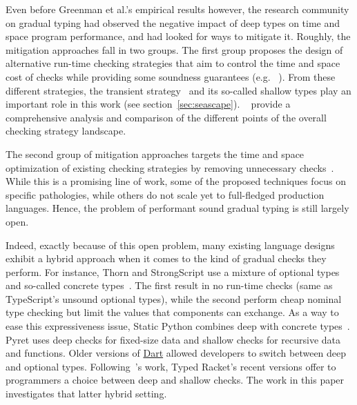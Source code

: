 Even before Greenman et al.'s empirical results however, the research
community on gradual typing had observed the negative impact of deep types
on time and space program performance, and had looked for ways to mitigate
it.  Roughly, the mitigation approaches fall in two groups. The first
group proposes the design of alternative run-time checking strategies that
aim to control the time and space cost of checks while providing
some soundness guarantees (e.g.
~\citep{sgt-esop-2009,rmhn-ecoop-2019,glfd-pj-2022,lgmvpk-pj-2023,svctg-esop-2015,rat-oopsla-2017,sfrbcsb-popl-2014,rsfbv-popl-2015,coersion-passing-style}).
From these different strategies, the transient
strategy~\cite{vksb-dls-2014,vss-popl-2017,v-thesis-2019} and its
so-called shallow types play an important role in this work (see
section~\ref{sec:seascape}).  ~\citet{type-untyped} provide a
comprehensive analysis and comparison of the different points of the
overall checking strategy landscape.

The second group of mitigation approaches targets the time and space optimization of
existing checking strategies by removing unnecessary
checks~\cite{collapsible,corpse-reviver, kas-pldi-2019,grmhn-vmil-2019,
rat-oopsla-2017,pycket,bbst-oopsla-2017}. While this is a promising line
of work, some of the proposed techniques focus on specific pathologies,
while others do not scale yet to full-fledged production languages.
Hence, the problem of performant sound gradual typing is still largely
open.   

Indeed, exactly because of this open problem, many existing language
designs exhibit a hybrid approach when it comes to the kind of gradual
checks they perform. For instance, Thorn and StrongScript use a mixture of
optional types and so-called concrete
types~\citep{wzlov-popl-2010,rzv-ecoop-2015}. The first result in no
run-time checks (same as TypeScript's unsound optional types), while the second
perform cheap nominal type checking but limit the values that components
can exchange.  As a way to ease this expressiveness issue, Static Python
combines deep with concrete types~\citep{lgmvpk-pj-2023}.  Pyret uses deep
checks for fixed-size data and shallow checks for recursive data and
functions.  Older versions of
\href{https://medium.com/dartlang/dart-2-stable-and-the-dart-web-platform-3775d5f8eac7}{Dart}
allowed developers to switch between  deep and optional types.
Following~\citet{g-deep-shallow}'s work, Typed Racket's recent versions
offer to programmers a choice between deep and shallow checks. The work in
this paper investigates that latter hybrid setting. 

